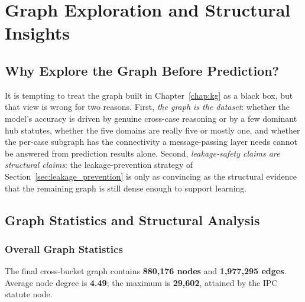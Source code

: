 \chapter{Graph Exploration and Structural Insights}
\label{chap:graph_exploration}

\section{Why Explore the Graph Before Prediction?}

It is tempting to treat the graph built in Chapter~\ref{chap:kg} as a black box, but that view is wrong for two reasons. First, \emph{the graph is the dataset}: whether the model's accuracy is driven by genuine cross-case reasoning or by a few dominant hub statutes, whether the five domains are really five or mostly one, and whether the per-case subgraph has the connectivity a message-passing layer needs cannot be answered from prediction results alone. Second, \emph{leakage-safety claims are structural claims}: the leakage-prevention strategy of Section~\ref{sec:leakage_prevention} is only as convincing as the structural evidence that the remaining graph is still dense enough to support learning.

\section{Graph Statistics and Structural Analysis}
\label{sec:graph_stats}

\subsection{Overall Graph Statistics}

The final cross-bucket graph contains \textbf{880{,}176 nodes} and \textbf{1{,}977{,}295 edges}. Average node degree is \textbf{4.49}; the maximum is \textbf{29{,}602}, attained by the \textsc{IPC} statute node.

